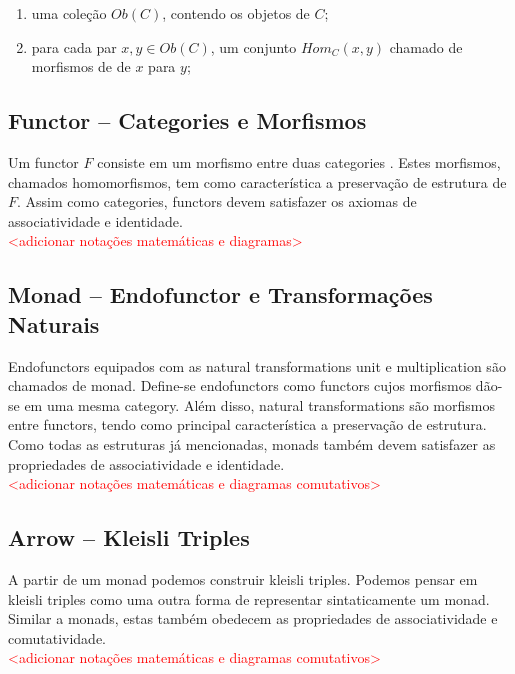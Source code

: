 \documentclass[10pt, conference]{IEEEtran}
\begin{document}
\begin{enumerate}[label=(\Alph*), leftmargin=4em, topsep=0pt,itemsep=1ex,partopsep=1ex,parsep=1ex]
  \item uma coleção $Ob(C)$, contendo os objetos de $C$;
  \item para cada par $x, y \in Ob(C)$, um conjunto $Hom_C(x, y)$ chamado de morfismos de de $x$ para $y$;
\end{enumerate}

\subsection{Functor -- Categories e Morfismos}

Um functor $F$ consiste em um morfismo entre duas categories \cite{maclane1971mat}. Estes morfismos, chamados homomorfismos, tem como característica a preservação de estrutura de $F$. Assim como categories, functors devem satisfazer os axiomas de associatividade e identidade.\\

\textcolor{red}{<adicionar notações matemáticas e diagramas>}

\subsection{Monad -- Endofunctor e Transformações Naturais}

Endofunctors equipados com as natural transformations unit e multiplication \cite{maclane1971mat} são chamados de monad. Define-se endofunctors como functors cujos morfismos dão-se em uma mesma category. Além disso, natural transformations são morfismos entre functors, tendo como principal característica a preservação de estrutura. Como todas as estruturas já mencionadas, monads também devem satisfazer as propriedades de associatividade e identidade.\\

\textcolor{red}{<adicionar notações matemáticas e diagramas comutativos>}

\subsection{Arrow -- Kleisli Triples}

A partir de um monad podemos construir kleisli triples. Podemos pensar em kleisli triples como uma outra forma de representar sintaticamente um monad. Similar a monads, estas também obedecem as propriedades de associatividade e comutatividade.\\

\textcolor{red}{<adicionar notações matemáticas e diagramas comutativos>}



\end{document}
